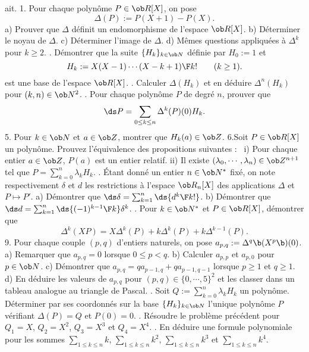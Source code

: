 \exo [Origin=,Level=1,Fight=3,Learn=4,Type=\Problèmes,Field=\EspacesVectoriels,Indication={1d) calculer l'image par $\Delta$ des espaces $\ob R_n[X]$.\medskip\noindent 5) Calculer $H_k(a)$ selon 3 cas.}] ait. 
1. Pour chaque polynôme $P\in\ob R[X]$, on pose 
$$
\Delta(P):=P(X+1)-P(X).
$$
a) Prouver que $\Delta$ définit un endomorphisme de l'espace $\ob R[X]$. 
\pn 
b) Déterminer le noyau de $\Delta$. 
\pn
c) Déterminer l'image de $\Delta$. 
\pn
d) Mêmes questions appliquées à $\Delta^k$ pour $k\ge2$. 
. Démontrer que la suite $\{H_k\}_{k\in\ob N}$ définie par $H_0:=1$ et 
$$
H_k:={X(X-1)\cdots(X-k+1)\F k!}\qquad(k\ge1).
$$ 
est une base de l'espace $\ob R[X]$.
\medskip
{}. Calculer $\Delta(H_k)$ et en déduire $\Delta^n(H_k)$ pour $(k,n)\in\ob N^2$. 
\medskip
{}. Pour chaque polynôme $P$ de degré $n$, prouver que 
$$
\ds P=\sum_{0\le k\le n}\Delta^k(P)(0)H_k.
$$
5. Pour $k\in\ob N$ et $a\in\ob Z$, montrer que $H_k(a)\in\ob Z$. 
\medskip
\noindent
6.Soit $P\in\ob R[X]$ un polynôme. Prouvez l'équivalence des propositions suivantes : 
\medskip
\noindent
\ i) Pour chaque entier $a\in\ob Z$, $P(a)$ est un entier relatif. 
\pn
ii) Il existe $(\lambda_0,\cdots,\lambda_n)\in\ob Z^{n+1}$ tel que $P=\sum_{k=0}^n\lambda_kH_k$. 
\medskip
{}. \'Etant donné un entier $n\in\ob N^*$ fixé, on note respectivement $\delta$ et $d$ les restrictions à l'espace $\ob R_n[X]$ des applications $\Delta$ et $P\mapsto P'$. 
\medskip
\noindent
a) Démontrer que $\ds\delta=\sum_{k=1}^n\ds{d^k\F k!}$. 
\smallskip
\noindent
b) Démontrer que $\ds d=\sum_{k=1}^n\ds{(-1)^{k-1}\F k}\delta^k$. 
\medskip
{}. Pour $k\in\ob N^*$ et $P\in\ob R[X]$, démontrer que 
$$
\Delta^k(XP)=X\Delta^k(P)+k\Delta^k(P)+k\Delta^{k-1}(P).
$$
9. Pour chaque couple $(p,q)$ d'entiers naturels, on pose $a_{p,q}:=\Delta^q\b(X^p\b)(0)$. 
\pn
a) Remarquer que $a_{p,q}=0$ lorsque $0\le p<q$. 
\pn
b) Calculer $a_{p,p}$ et $a_{p,0}$ pour $p\in\ob N$. 
\pn
c) Démontrer que $a_{p,q}=qa_{p-1,q}+qa_{p-1,q-1}$ lorsque $p\ge1$ et $q\ge1$. 
\pn
d) En déduire les valeurs de $a_{p,q}$ pour $(p,q)\in\{0,\cdots,5\}^2$ et les classer dans un tableau analogue au triangle de Pascal.  
\medskip
{}. Soit $Q:=\sum_{k=0}^n\lambda_kH_k$ un polynôme. Déterminer par ses coordonnés sur la base $\{H_k\}_{k\in\ob N}$ l'unique polynôme $P$ vérifiant $\Delta(P)=Q$ et $P(0)=0$. 
\medskip
{}. Résoudre le problème précédent pour $Q_1=X$, $Q_2=X^2$, $Q_3=X^3$ et $Q_4=X^4$. 
\medskip
{}. En déduire une formule polynomiale pour les sommes $\sum\limits_{1\le k\le n}k$, $\sum\limits_{1\le k\le n}k^2$, $\sum\limits_{1\le k\le n}k^3$ et $\sum\limits_{1\le k\le n}k^4$. 

